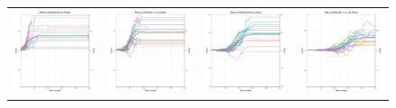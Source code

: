 \begin{figure}
\centering
\begin{tabular}{cccc}
\hspace{-0.5cm}\includegraphics[width = 1.55in]{images/Visualizations/ANNvsRANDOM/500ms5x5.png} &
\hspace{-0.5cm}\includegraphics[width = 1.55in]{images/Visualizations/ANNvsRANDOM/500ms7x7.png} &
\hspace{-0.5cm}\includegraphics[width = 1.55in]{images/Visualizations/ANNvsRANDOM/500ms9x9.png} &
\hspace{-0.5cm}\includegraphics[width = 1.55in]{images/Visualizations/ANNvsRANDOM/500ms11x11.png} \\


\end{tabular}
\end{figure}
